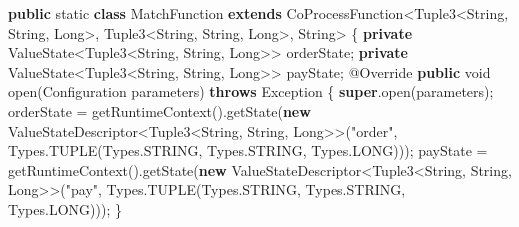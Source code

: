 \documentclass[cn,11pt,chinese]{elegantbook}
\newenvironment{Shaded}{}{}
\newcommand{\AttributeTok}[1]{\textcolor[rgb]{0.49,0.56,0.16}{#1}}
\newcommand{\BuiltInTok}[1]{#1}
\newcommand{\DataTypeTok}[1]{\textcolor[rgb]{0.56,0.13,0.00}{#1}}
\newcommand{\FunctionTok}[1]{\textcolor[rgb]{0.02,0.16,0.49}{#1}}
\newcommand{\KeywordTok}[1]{\textcolor[rgb]{0.00,0.44,0.13}{\textbf{#1}}}
\newcommand{\NormalTok}[1]{#1}
\newcommand{\StringTok}[1]{\textcolor[rgb]{0.25,0.44,0.63}{#1}}
\begin{document}
\begin{Shaded}
\begin{Highlighting}[]
    \KeywordTok{public} \DataTypeTok{static} \KeywordTok{class}\NormalTok{ MatchFunction }\KeywordTok{extends}\NormalTok{ CoProcessFunction\textless{}Tuple3\textless{}}\BuiltInTok{String}\NormalTok{, }\BuiltInTok{String}\NormalTok{, }\BuiltInTok{Long}\NormalTok{\textgreater{}, Tuple3\textless{}}\BuiltInTok{String}\NormalTok{, }\BuiltInTok{String}\NormalTok{, }\BuiltInTok{Long}\NormalTok{\textgreater{}, }\BuiltInTok{String}\NormalTok{\textgreater{} \{}
        \KeywordTok{private}\NormalTok{ ValueState\textless{}Tuple3\textless{}}\BuiltInTok{String}\NormalTok{, }\BuiltInTok{String}\NormalTok{, }\BuiltInTok{Long}\NormalTok{\textgreater{}\textgreater{} orderState;}
        \KeywordTok{private}\NormalTok{ ValueState\textless{}Tuple3\textless{}}\BuiltInTok{String}\NormalTok{, }\BuiltInTok{String}\NormalTok{, }\BuiltInTok{Long}\NormalTok{\textgreater{}\textgreater{} payState;}
        \AttributeTok{@Override}
        \KeywordTok{public} \DataTypeTok{void} \FunctionTok{open}\NormalTok{(}\BuiltInTok{Configuration}\NormalTok{ parameters) }\KeywordTok{throws} \BuiltInTok{Exception}\NormalTok{ \{}
            \KeywordTok{super}\NormalTok{.}\FunctionTok{open}\NormalTok{(parameters);}
\NormalTok{            orderState = }\FunctionTok{getRuntimeContext}\NormalTok{().}\FunctionTok{getState}\NormalTok{(}\KeywordTok{new}\NormalTok{ ValueStateDescriptor\textless{}Tuple3\textless{}}\BuiltInTok{String}\NormalTok{, }\BuiltInTok{String}\NormalTok{, }\BuiltInTok{Long}\NormalTok{\textgreater{}\textgreater{}(}\StringTok{"order"}\NormalTok{, }\BuiltInTok{Types}\NormalTok{.}\FunctionTok{TUPLE}\NormalTok{(}\BuiltInTok{Types}\NormalTok{.}\FunctionTok{STRING}\NormalTok{, }\BuiltInTok{Types}\NormalTok{.}\FunctionTok{STRING}\NormalTok{, }\BuiltInTok{Types}\NormalTok{.}\FunctionTok{LONG}\NormalTok{)));}
\NormalTok{            payState = }\FunctionTok{getRuntimeContext}\NormalTok{().}\FunctionTok{getState}\NormalTok{(}\KeywordTok{new}\NormalTok{ ValueStateDescriptor\textless{}Tuple3\textless{}}\BuiltInTok{String}\NormalTok{, }\BuiltInTok{String}\NormalTok{, }\BuiltInTok{Long}\NormalTok{\textgreater{}\textgreater{}(}\StringTok{"pay"}\NormalTok{, }\BuiltInTok{Types}\NormalTok{.}\FunctionTok{TUPLE}\NormalTok{(}\BuiltInTok{Types}\NormalTok{.}\FunctionTok{STRING}\NormalTok{, }\BuiltInTok{Types}\NormalTok{.}\FunctionTok{STRING}\NormalTok{, }\BuiltInTok{Types}\NormalTok{.}\FunctionTok{LONG}\NormalTok{)));}
\NormalTok{        \}}


\end{Highlighting}
\end{Shaded}
\end{document}
